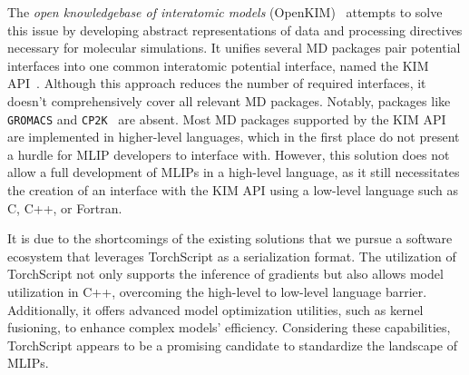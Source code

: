 The \emph{open knowledgebase of interatomic models} (OpenKIM)~\cite{karls2020openkim} attempts to solve this issue by developing abstract representations of data and processing directives necessary for molecular simulations.
It unifies several MD packages pair potential interfaces into one common interatomic potential interface, named the KIM API~\cite{elliott2011kim}.
Although this approach reduces the number of required interfaces, it doesn't comprehensively cover all relevant MD packages.
Notably, packages like \texttt{GROMACS} and \texttt{CP2K}~\cite{kuhne2020cp2k} are absent.
Most MD packages supported by the KIM API are implemented in higher-level languages, which in the first place do not present a hurdle for MLIP developers to interface with.
However, this solution does not allow a full development of MLIPs in a high-level language, as it still necessitates the creation of an interface with the KIM API using a low-level language such as C, C++, or Fortran.

It is due to the shortcomings of the existing solutions that we pursue a software ecosystem that leverages TorchScript as a serialization format.
The utilization of TorchScript not only supports the inference of gradients but also allows model utilization in C++, overcoming the high-level to low-level language barrier.
Additionally, it offers advanced model optimization utilities, such as kernel fusioning, to enhance complex models' efficiency.
Considering these capabilities, TorchScript appears to be a promising candidate to standardize the landscape of MLIPs.

%




